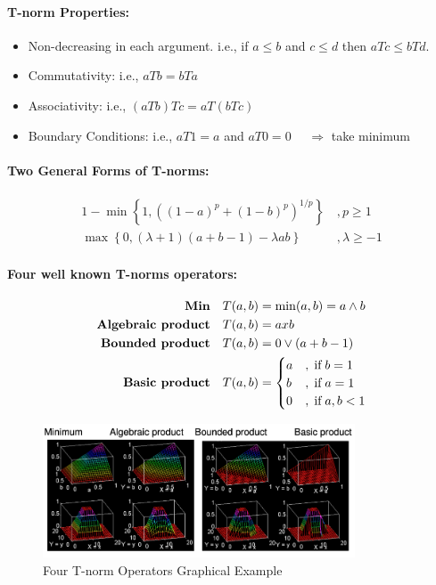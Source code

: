 \documentclass{tron}
\begin{document}
\paragraph{T-norm Properties:}
\begin{itemize}
	\item Non-decreasing in each argument. i.e., if $a\leq b$ and $c \leq d$ then $aTc \leq bTd$.
	\item Commutativity: i.e., $aTb = bTa$
	\item Associativity: i.e., $(aTb)Tc = aT(bTc)$
	\item Boundary Conditions: i.e., $aT1 = a$ and $aT0 = 0$ $\quad \Rightarrow $ take minimum
\end{itemize}

\paragraph{Two General Forms of T-norms:}
\begin{align}
	1 - \min \left\{1, \left((1-a)^p + (1-b)^p \right)^{1/p}\right\}\, &, p \geq 1 \\
	\max \left\{0, (\lambda + 1)(a+b-1) - \lambda ab\right\}\, &, \lambda \geq -1
\end{align}

\paragraph{Four well known T-norms operators:}
\begin{align}
	\textbf{Min} 				\quad & T(a,b) = \min(a,b) = a \land b \\
	\textbf{Algebraic product} 	\quad & T(a,b) = a x b \\
	\textbf{Bounded product} 	\quad & T(a,b) = 0 \lor (a + b - 1) \\
	\textbf{Basic product} 		\quad & T(a,b) = \begin{cases}
		a & ,\;\text{if}\; b = 1 \\
		b & ,\;\text{if}\; a = 1 \\
		0 & ,\;\text{if}\; a, b < 1 \\
	\end{cases} 
\end{align}

\begin{figure}[H]
	\centering
	\includegraphics[height=150px]{Figs/Fuzzy/T-norm}
	\caption{Four T-norm Operators Graphical Example}
	\label{fig:fuzzy:T-norm:ex}
\end{figure}
\end{document}
